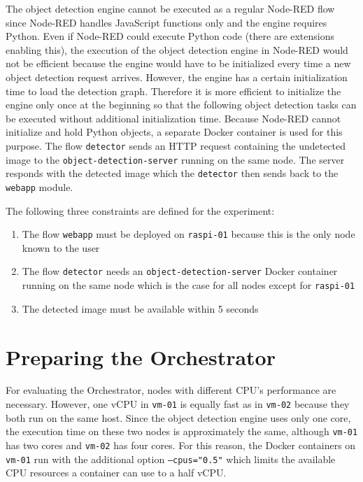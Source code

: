 The object detection engine cannot be executed as a regular Node-RED flow since Node-RED handles JavaScript functions only and the engine requires Python.
Even if Node-RED could execute Python code (there are extensions enabling this), the execution of the object detection engine in Node-RED would not be efficient because the engine would have to be initialized every time a new object detection request arrives.
However, the engine has a certain initialization time to load the detection graph. Therefore it is more efficient to initialize the engine only once at the beginning so that the following object detection tasks can be executed without additional initialization time. Because Node-RED cannot initialize and hold Python objects, a separate Docker container is used for this purpose. The flow \texttt{detector} sends an HTTP request containing the undetected image to the \texttt{object-detection-server} running on the same node. The server responds with the detected image which the \texttt{detector} then sends back to the \texttt{webapp} module.

The following three constraints are defined for the experiment:
\begin{enumerate}
    \item The flow \texttt{webapp} must be deployed on \texttt{raspi-01} because this is the only node known to the user
    \item The flow \texttt{detector} needs an \texttt{object-detection-server} Docker container running on the same node which is the case for all nodes except for \texttt{raspi-01}
    \item The detected image must be available within 5 seconds
\end{enumerate}








\section{Preparing the Orchestrator\label{sec:eval-preparing-the-orchestrator}}

For evaluating the Orchestrator, nodes with different CPU's performance are necessary.
However, one vCPU in \texttt{vm-01} is equally fast as in \texttt{vm-02} because they both run on the same host.
Since the object detection engine uses only one core, the execution time on these two nodes is approximately the same, although \texttt{vm-01} has two cores and \texttt{vm-02} has four cores.
For this reason, the Docker containers on \texttt{vm-01} run with the additional option \texttt{---cpus="0.5"} which limits the available CPU resources a container can use to a half vCPU.

